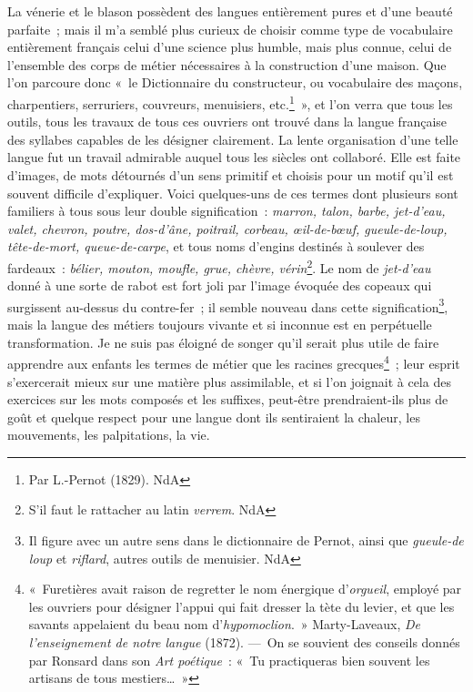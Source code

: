 \documentclass[french,twoside]{book} %
\newcommand\chapterclose{} %
\begin{document}
La vénerie et le blason possèdent des langues entièrement pures et d’une beauté parfaite ; mais il m’a semblé plus curieux de choisir comme type de vocabulaire entièrement français celui d’une science plus humble, mais plus connue, celui de l’ensemble des corps de métier nécessaires à la construction d’une maison. Que l’on parcoure donc « le Dictionnaire du constructeur, ou vocabulaire des maçons, charpentiers, serruriers, couvreurs, menuisiers, etc.\footnote{Par L.-Pernot (1829). NdA} », et l’on verra que tous les outils, tous les travaux de tous ces ouvriers ont trouvé dans la langue française des syllabes capables de les désigner clairement. La lente organisation d’une telle langue fut un travail admirable auquel tous les siècles ont collaboré. Elle est faite d’images, de mots détournés d’un sens primitif et choisis pour un motif qu’il est souvent difficile d’expliquer. Voici quelques-uns de ces termes dont plusieurs sont familiers à tous sous leur double signification : {\itshape marron, talon, barbe, jet-d’eau, valet, chevron, poutre, dos-d’âne, poitrail, corbeau, œil-de-bœuf, gueule-de-loup, tête-de-mort, queue-de-carpe}, et tous noms d’engins destinés à soulever des fardeaux : {\itshape bélier, mouton, moufle, grue, chèvre, vérin}\footnote{S’il faut le rattacher au latin {\itshape verrem}. NdA}. Le nom de {\itshape jet-d’eau} donné à une sorte de rabot est fort joli par l’image évoquée des copeaux qui surgissent au-dessus du contre-fer ; il semble nouveau dans cette signification\footnote{Il figure avec un autre sens dans le dictionnaire de Pernot, ainsi que {\itshape gueule-de loup} et {\itshape riflard}, autres outils de menuisier. NdA}, mais la langue des métiers toujours vivante et si inconnue est en perpétuelle transformation. Je ne suis pas éloigné de songer qu’il serait plus utile de faire apprendre aux enfants les termes de métier que les racines grecques\footnote{« Furetières avait raison de regretter le nom énergique d’{\itshape orgueil}, employé par les ouvriers pour désigner l’appui qui fait dresser la tète du levier, et que les savants appelaient du beau nom d’{\itshape hypomoclion}. » Marty-Laveaux, {\itshape De l’enseignement de notre langue} (1872). — On se souvient des conseils donnés par Ronsard dans son {\itshape Art poétique} : « Tu practiqueras bien souvent les artisans de tous mestiers… »} ; leur esprit s’exercerait mieux sur une matière plus assimilable, et si l’on joignait à cela des exercices sur les mots composés et les suffixes, peut-être prendraient-ils plus de goût et quelque respect pour une langue dont ils sentiraient la chaleur, les mouvements, les palpitations, la vie.
\chapterclose
\end{document}
